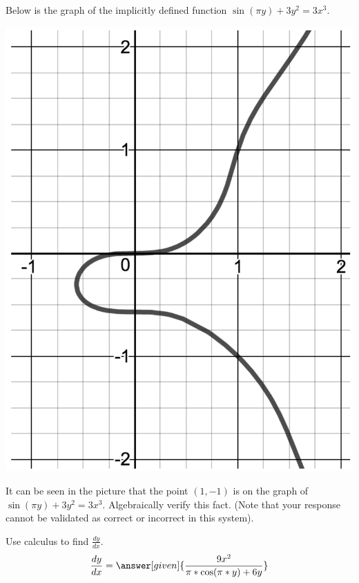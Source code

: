 \documentclass[handout]{ximera}
\begin{document}
\begin{problem}
Below is the graph of the implicitly defined function $\displaystyle\sin \left(\pi y\right)+3y^2=3x^3$. 

\includegraphics[scale=0.1]{Exam2-ImpDiff2.png}


	\begin{question}
	It can be seen in the picture that the point $(1,-1)$ is on the graph of $\displaystyle\sin \left(\pi y\right)+3y^2=3x^3$. Algebraically verify this fact. (Note that your response cannot be validated as correct or incorrect in this system).\\
    \begin{freeResponse}
    \end{freeResponse}
    \end{question}
    
	
	\begin{question}
    Use calculus to find $\displaystyle\frac{dy}{dx}$.\\
    
    \[
    \displaystyle \dfrac{dy}{dx} = \answer[given]{\dfrac{9x^2}{\pi *\cos(\pi*y) + 6y}}
    \]
    \end{question}
    


\end{problem}
\end{document}
